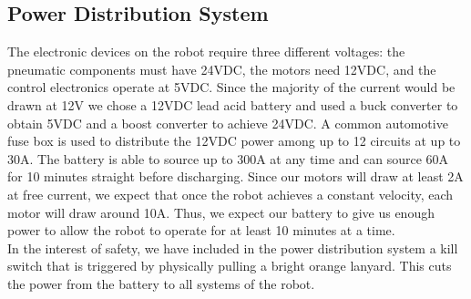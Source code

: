 \documentclass[letterpaper,12pt]{article}
\begin{document}
\subsection{Power Distribution System}
The electronic devices on the robot require three different voltages: the pneumatic components must have 24VDC, the motors need 12VDC, and the control electronics operate at 5VDC. Since the majority of the current would be drawn at 12V we chose a 12VDC lead acid battery and used a buck converter to obtain 5VDC and a boost converter to achieve 24VDC. A common automotive fuse box is used to distribute the 12VDC power among up to 12 circuits at up to 30A. The battery is able to source up to 300A at any time and can source 60A for 10 minutes straight before discharging. Since our motors will draw at least 2A at free current, we expect that once the robot achieves a constant velocity, each motor will draw around 10A. Thus, we expect our battery to give us enough power to allow the robot to operate for at least 10 minutes at a time.\\
In the interest of safety, we have included in the power distribution system a kill switch that is triggered by physically pulling a bright orange lanyard. This cuts the power from the battery to all systems of the robot.\\
\end{document}
